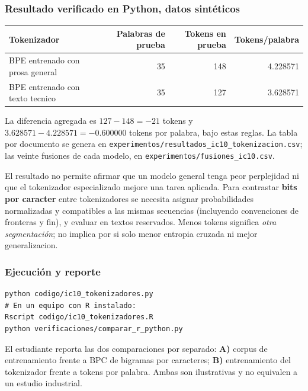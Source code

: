 \subsubsection*{Resultado verificado en Python, datos sintéticos}
\begin{center}\begin{tabular}{lrrr}\toprule
Tokenizador & Palabras de prueba & Tokens en prueba & Tokens/palabra\\\midrule
BPE entrenado con prosa general & 35 & 148 & 4.228571\\
BPE entrenado con texto tecnico & 35 & 127 & 3.628571\\\bottomrule
\end{tabular}\end{center}
La diferencia agregada es $127-148=-21$ tokens y
$3.628571-4.228571=-0.600000$ tokens por palabra, bajo estas reglas.
La tabla por documento se genera en
\nolinkurl{experimentos/resultados_ic10_tokenizacion.csv}; las veinte
fusiones de cada modelo, en \nolinkurl{experimentos/fusiones_ic10.csv}.
\begin{verificacion}
El resultado no permite afirmar que un modelo general tenga peor
perplejidad ni que el tokenizador especializado mejore una tarea aplicada.
Para contrastar \textbf{bits por caracter} entre tokenizadores se
necesita asignar probabilidades normalizadas y compatibles a las mismas
secuencias (incluyendo convenciones de fronteras y fin), y evaluar en
textos reservados. Menos tokens significa \emph{otra segmentación}; no
implica por si solo menor entropia cruzada ni mejor generalizacion.
\end{verificacion}
\subsubsection*{Ejecución y reporte}
\begin{verbatim}
python codigo/ic10_tokenizadores.py
# En un equipo con R instalado:
Rscript codigo/ic10_tokenizadores.R
python verificaciones/comparar_r_python.py
\end{verbatim}
El estudiante reporta las dos comparaciones por separado:
\textbf{A)} corpus de entrenamiento frente a BPC de bigramas por
caracteres; \textbf{B)} entrenamiento del tokenizador frente a tokens por
palabra. Ambas son ilustrativas y no equivalen a un estudio industrial.





